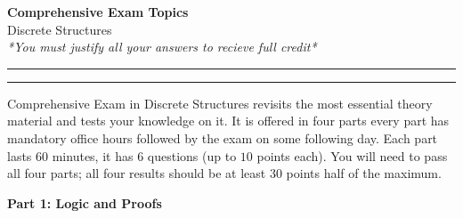 \documentclass[a4paper,12pt]{article}
\begin{document}
\begin{center}
{\bf\Huge Comprehensive Exam Topics} \\[5pt]
Discrete Structures \\
\textit{*You must justify all your answers to recieve full credit*}
\end{center}

\hrule
\vspace{2pt}
\hrule
\vspace{12pt}

Comprehensive Exam in Discrete Structures revisits the most essential theory material and tests your knowledge on it.
It is offered in four parts \textendash{} every part has mandatory office hours
followed by the exam on some following day.
Each part lasts $60$ minutes, it has $6$ questions (up to $10$ points each).
You will need to pass all four parts;
all four results should be at least $30$ points  \textendash{} half of the maximum.


\vspace{10pt}
{\bf Part 1: Logic and Proofs}
\end{document}
